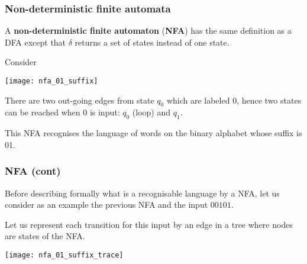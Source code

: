 
% 
\begin{frame}
\frametitle{Non-deterministic finite automata}

\label{nfa_01_suffix}

A \textbf{non-deterministic finite automaton} (\textbf{NFA}) has the
same definition as a DFA except that \(\delta\) returns a set of
states instead of one state.

\bigskip

Consider
\begin{center}
\texttt{[image: nfa\_01\_suffix]}
\end{center}
There are two out-going edges from state \(q_0\) which are labeled
\(0\), hence two states can be reached when \(0\) is input: \(q_0\)
(loop) and \(q_1\).

\bigskip

This NFA recognises the language of words on the binary alphabet whose
suffix is 01.

\end{frame}

% 
\begin{frame}
\frametitle{NFA (cont)}

Before describing formally what is a recognisable language by a NFA,
let us consider as an example the previous NFA and the input
\(00101\).

\bigskip

Let us represent each transition for this input by an edge in a tree
where nodes are states of the NFA.
\begin{center}
  \texttt{[image: nfa\_01\_suffix\_trace]}
\end{center}

\end{frame}

